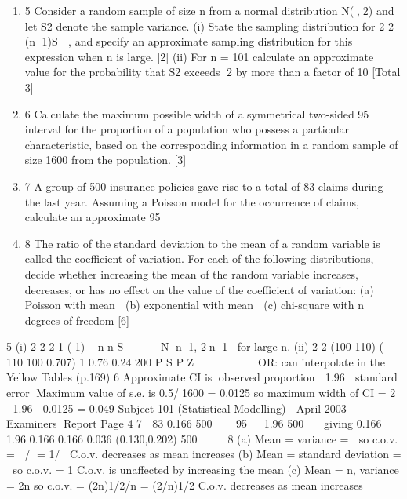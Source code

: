\documentclass[a4paper,12pt]{article}
\begin{document}
\begin{enumerate}
\item 5 Consider a random sample of size n from a normal distribution N(,2) and let S2
denote the sample variance.
(i) State the sampling distribution for
2
2
(n 1)S

, and specify an approximate
sampling distribution for this expression when n is large. [2]
(ii) For n = 101 calculate an approximate value for the probability that S2 exceeds
2 by more than a factor of 10%
[Total 3]

\item 6 Calculate the maximum possible width of a symmetrical two-sided 95%
interval for the proportion of a population who possess a particular characteristic,
based on the corresponding information in a random sample of size 1600 from the
population. [3]
\item 7 A group of 500 insurance policies gave rise to a total of 83 claims during the last year.
Assuming a Poisson model for the occurrence of claims, calculate an approximate
95%

\item 8 The ratio of the standard deviation to the mean of a random variable is called the
coefficient of variation.
For each of the following distributions, decide whether increasing the mean of the
random variable increases, decreases, or has no effect on the value of the coefficient
of variation:
(a) Poisson with mean 
(b) exponential with mean 
(c) chi-square with n degrees of freedom [6]
\end{enumerate}

\newpage

5 (i)
2
2
2 1
( 1) ~ n
n S




 N n 1, 2n 1 for large n.
(ii)
2
2
(100 110) ( 110 100 0.707) 1 0.76 0.24
200
P S P Z 
      

OR: can interpolate in the Yellow Tables (p.169)
6 Approximate CI is observed proportion  {1.96  standard error}
Maximum value of s.e. is 0.5/1600 = 0.0125
so maximum width of CI = 2  1.96  0.0125 = 0.049
Subject 101 (Statistical Modelling)  April 2003  Examiners Report
Page 4
7  83 0.166
500
  
95%
  1.96
500


giving 0.166 1.96 0.166 0.166 0.036 (0.130,0.202)
500
   
8 (a) Mean = variance =  so c.o.v. = / = 1/
C.o.v. decreases as mean increases
(b) Mean = standard deviation =  so c.o.v. = 1
C.o.v. is unaffected by increasing the mean
(c) Mean = n, variance = 2n so c.o.v. = (2n)1/2/n = (2/n)1/2
C.o.v. decreases as mean increases
\end{document}
